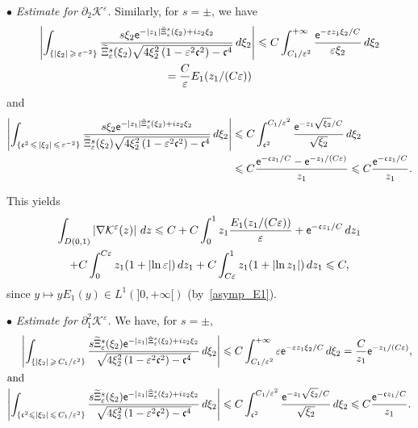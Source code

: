 \documentclass[10pt]{amsart}
\theoremstyle{definition}\newtheorem{defi}[theo]{Definition}\newtheorem{rema}[theo]{Remark}\newtheorem{exam}[theo]{Example}\newtheorem{exem}[theo]{Example}\newtheorem{nota}[theo]{Notation}
\newcommand*\p{\partial}
\newcommand*\BK{\mathcal{K}}
\newcommand*\ex{{\sf e}}
\newcommand*\cs{{\mathfrak c}}
\newcommand*\ii{\infty}
\newcommand*\gs{\geqslant }
\newcommand*\ls{\leqslant }
\newcommand*\e{\varepsilon}
\renewcommand*\t{\tilde}
\let\oldtilde\tilde
\renewcommand*{\tilde}[1]{\mathchoice{\widetilde{#1}}{\widetilde{#1}}{\oldtilde{#1}}{\oldtilde{#1}}}
\begin{document}
$ \bullet $ \emph{Estimate for $ \p_2 \BK^\e $.} Similarly, for $ s = \pm $, we have
\begin{multline*}
\left\lvert \int_{\left\{ |\xi_2 |\, \gs\,\e^{-2} \right\} } \frac{ s \xi_2 \ex^{- |z_1| \t\Xi_\e^s (\xi_2) + i z_2 \xi_2} }{
\t\Xi_\e^s (\xi_2) \sqrt{ 4 \xi_2^2 \left(1 - \e^2 \cs^2\right) - \cs^4 } } \, d\xi_2 \right\rvert \ls C \int_{C_1 / \e^{2}}^{+\ii } \frac{ \ex^{- \e z_1 \xi_2 / C } }{ \e \xi_2} \, d\xi_2 \\
= \frac{C}{\e} E_1 (z_1/(C \e))
\end{multline*}
and
\begin{align*}
\left\lvert \int_{\left\{ \cs^2\,\ls\,|\xi_2 |\,\ls\,\e^{-2}\right\} } \frac{ s \xi_2 \ex^{- |z_1| \t\Xi_\e^s (\xi_2) + i z_2 \xi_2} }{
\t\Xi_\e^s (\xi_2) \sqrt{ 4 \xi_2^2 \left(1 - \e^2 \cs^2\right) - \cs^4 } } \, d\xi_2 \right\rvert & \ls C \int_{\cs^2}^{C_1 / \e^{2}} \frac{ \ex^{- z_1 \sqrt{ \xi_2} / C } }{\sqrt{ \xi_2} } \, d\xi_2
\\ & \ls C \frac{ \ex^{ - \cs z_1/ C } - \ex^{- z_1/(C \e) } }{z_1}
\ls C \frac{ \ex^{ - \cs z_1/ C } }{z_1}.
\end{align*}

This yields
\begin{multline*}
\int_{D(0,1)} \left\lvert \nabla \BK^\e (z) \right\rvert \, dz  \ls C + C \int_0^1 z_1 \frac{ E_1(z_1/ (C \e)) }{ \e} + \ex^{ - \cs z_1/C } \, d z_1
\\ + C \int_0^{C \e} z_1 (1 + \lvert \ln \e \rvert) \, d z_1 + C \int_{C\e}^1 z_1 (1 + \lvert \ln z_1 \rvert) \, d z_1
\ls C,
\end{multline*}
since $ y \mapsto y E_1 (y) \in L^1 (]0,+\ii[) $ (by~\eqref{asymp_E1}).

\vspace*{4pt}

\noindent $ \bullet $ \emph{Estimate for $ \p_1^2 \BK^\e $.} We have, for $ s = \pm $,
\begin{align*}
\left\lvert \int_{\left\{ |\xi_2 |\, \gs\,C_1 / \e^{2} \right\} } \frac{ s \t\Xi_\e^s (\xi_2) \ex^{- |z_1| \t\Xi_\e^s (\xi_2) + i z_2 \xi_2} }{
\sqrt{ 4 \xi_2^2 \left(1 - \e^2 \cs^2\right) - \cs^4 } } \, d\xi_2 \right\rvert & \ls C \int_{C_1 / \e^{2}}^{+\ii } \e \ex^{- \e z_1 \xi_2/ C } \, d\xi_2 = \frac{C}{z_1} \ex^{ - z_1/(C \e)},
\\
\intertext{and}
\left\lvert \int_{\left\{ \cs^2 \ls |\xi_2 |\,\ls\,C_1 / \e^{2}\right\} } \frac{ s \t\Xi_\e^s (\xi_2) \ex^{- |z_1| \t\Xi_\e^s (\xi_2) + i z_2 \xi_2} }{
\sqrt{ 4 \xi_2^2 \left(1 - \e^2 \cs^2\right) - \cs^4 } } \, d\xi_2 \right\rvert & \ls C \int_{\cs^2}^{C_1 / \e^{2}} \frac{ \ex^{- z_1 \sqrt{ \xi_2} /C } }{ \sqrt{\xi_2} } \, d\xi_2
\ls C \frac{ \ex^{ - \cs z_1/C } }{z_1}.
\end{align*}
\end{document}

